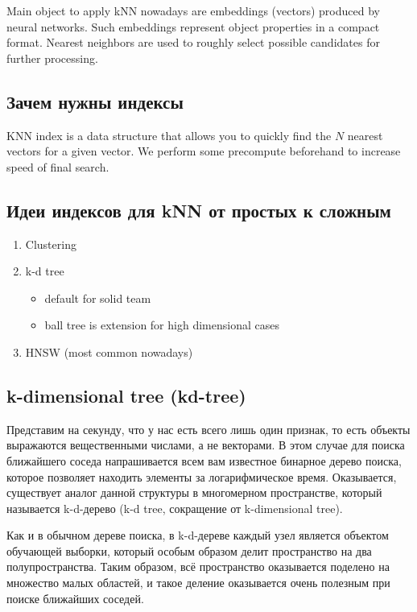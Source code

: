 Main object to apply kNN nowadays are embeddings (vectors) produced by neural networks.
Such embeddings represent object properties in a compact format.
Nearest neighbors are used to roughly select possible candidates for further processing.

\subsection{Зачем нужны индексы}

KNN index is a data structure that allows you to quickly find the $N$ nearest vectors for a given vector.
We perform some precompute beforehand to increase speed of final search.

\subsection{Идеи индексов для kNN от простых к сложным}

\begin{enumerate}
    \item Clustering
    \item k-d tree
    \begin{itemize}
        \item default for solid team
        \item ball tree is extension for high dimensional cases
    \end{itemize}
    \item HNSW (most common nowadays)
\end{enumerate}

\subsection{k-dimensional tree (kd-tree)}

Представим на секунду, что у нас есть всего лишь один признак, то есть объекты выражаются вещественными числами, а
не векторами.
В этом случае для поиска ближайшего соседа напрашивается всем вам известное бинарное дерево поиска, которое
позволяет находить элементы за логарифмическое время.
Оказывается, существует аналог данной структуры в многомерном пространстве, который называется k-d-дерево
(k-d tree, сокращение от k-dimensional tree).

Как и в обычном дереве поиска, в k-d-дереве каждый узел является объектом обучающей выборки, который особым образом
делит пространство на два полупространства.
Таким образом, всё пространство оказывается поделено на множество малых областей, и такое деление оказывается очень
полезным при поиске ближайших соседей.

